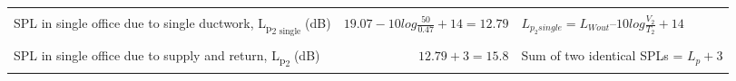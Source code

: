 \begin{sidewaystable}[htbp]
\begin{tabular}{@{}m{5cm}rm{12cm}@{}}
		& \multicolumn{1}{l}{} &  \\
		SPL in single office due to single ductwork, L\textsubscript{p\textsubscript{2 single}} (dB) & $19.07 - 10 log \frac{50}{0.47} + 14 = 12.79$ & $L_{p_2 single} = L_{W out} – 10 log \frac{V_2}{T_{2}} + 14$ \\
		& \multicolumn{1}{l}{} &  \\
		SPL in single office due to supply and return, L\textsubscript{p\textsubscript{2}} (dB) & $12.79 + 3 = 15.8$ & Sum of two identical SPLs = $L_p + 3$ \\ \bottomrule
	\end{tabular}
\end{sidewaystable}